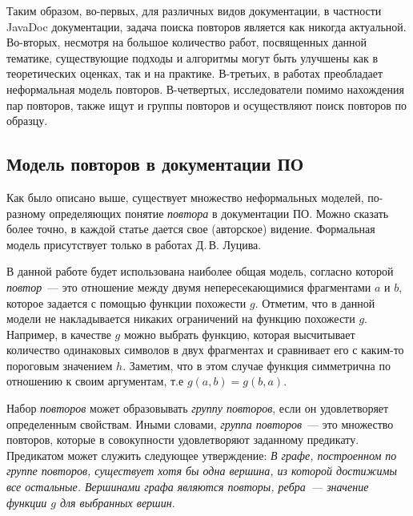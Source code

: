 Таким образом, во-первых, для различных видов документации, в частности JavaDoc  документации, задача поиска повторов является  как никогда актуальной.
Во-вторых, несмотря на большое количество работ, посвященных  данной тематике, существующие подходы и алгоритмы могут быть  улучшены как в теоретических оценках, так и на практике.
В-третьих, в работах преобладает неформальная модель повторов.
В-четвертых, исследователи помимо нахождения пар повторов, также ищут и группы повторов и осуществляют поиск повторов по образцу.


\subsection{Модель повторов в документации ПО}\label{Model}
Как было описано выше, существует множество неформальных моделей, по-разному определяющих понятие \emph{повтора} в документации ПО.
Можно сказать более точно, в каждой статье дается свое (авторское) видение.
Формальная модель присутствует только в работах Д.\,В. Луцива.

В данной работе будет использована наиболее общая модель, согласно которой \emph{повтор}~--- это отношение между двумя непересекающимися фрагментами $a$ и $b$, которое задается с помощью функции похожести $g$.
Отметим, что в данной модели не накладывается никаких ограничений на функцию похожести $g$.
Например, в качестве $g$ можно выбрать функцию, которая высчитывает количество одинаковых символов в двух фрагментах и сравнивает его с каким-то пороговым значением $h$. Заметим, что в этом случае функция симметрична по отношению к своим аргументам, т.е $g(a,b) = g(b,a)$.


Набор \emph{повторов} может образовывать \emph{группу повторов}, если он удовлетворяет определенным свойствам. Иными словами, \emph{группа повторов}~--- это множество повторов, которые в совокупности удовлетворяют заданному предикату.
Предикатом может служить следующее утверждение: \emph{В графе, построенном по группе повторов, существует хотя бы одна вершина, из которой достижимы все остальные. Вершинами графа являются повторы, ребра~--- значение функции $g$  для выбранных вершин}.

